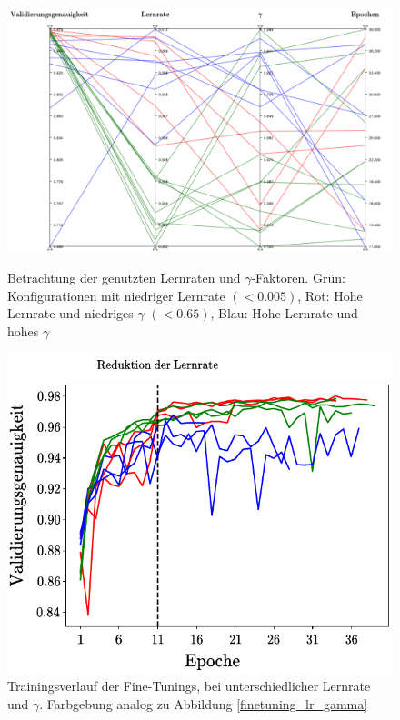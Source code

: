 \begin{figure}[h]
\includegraphics[scale=0.58]{NNOPT/finetuning_lr_gamma.pdf}
\caption{Betrachtung der genutzten Lernraten und $\gamma$-Faktoren. Grün: Konfigurationen mit niedriger Lernrate $(<0.005)$, Rot: Hohe Lernrate und niedriges $\gamma$ $(<0.65)$, Blau: Hohe Lernrate und hohes $\gamma$}
\label{finetuning_lr_gamma}

\centering
\includegraphics[scale=1]{NNOPT/finetuning_lr_gamma_verlauf.pdf}
\caption{Trainingsverlauf der Fine-Tunings, bei unterschiedlicher Lernrate und $\gamma$. Farbgebung analog zu Abbildung \ref{finetuning_lr_gamma}}
\label{finetuning_lr_gamma_verlauf}
\end{figure}
\\
